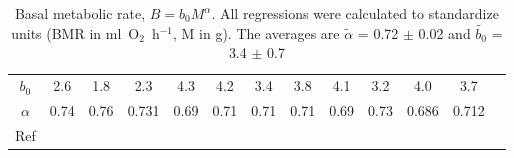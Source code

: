 \documentclass[12pt]{iopart}
\begin{document}
\begin{table}%
\centering
\begin{tabular}{|c|c|c|c|c|c|c|c|c|c|c|c|c|}
\hline
$b_0$ & 2.6  & 1.8  & 2.3  & 4.3 &4.2 & 3.4 & 3.8 &4.1 &3.2 &4.0& 3.7 \\
$\alpha$  & 0.74  & 0.76  & 0.731  & 0.69  & 0.71  & 0.71  & 0.71 & 0.69  & 0.73  & 0.686  & 0.712  \\
Ref  &\cite{Kleiber32}  &\cite{Gano38} &\cite{Brody45}    &\cite{Hayssen85} &\cite{Elgar87} &\cite{McNab88} &\cite{Heusner91} &\cite{Lovegrove00} &\cite{Symonds02} &\cite{White03} &\cite{Savage04} \\
\hline
\end{tabular}
\caption{Basal metabolic rate, $B = b_0 M^\alpha$. All regressions were calculated to standardize units (BMR in ml~O$_2$~h$^{-1}$, M in g). The averages are $\tilde{\alpha}$ = 0.72 $\pm$ 0.02 and $\tilde{b_0}$ = 3.4 $\pm$ 0.7}
\label{tab:alpha}
\end{table}
\end{document}
